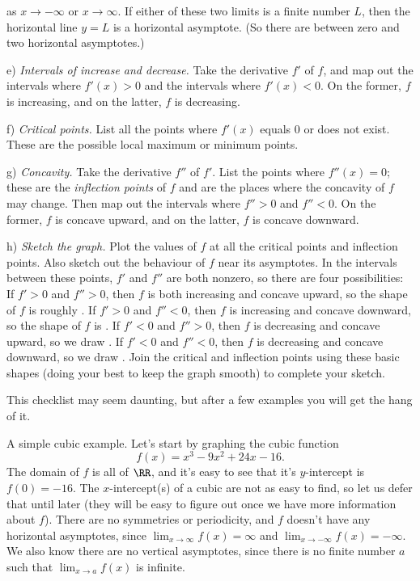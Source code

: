 as $x\to -\infty$ or $x\to \infty$. If either of these two limits is a finite number $L$, then the
horizontal line $y=L$ is a horizontal asymptote. (So there are between zero and two horizontal asymptotes.)
\smallskip
\item{e)} {\it Intervals of increase and decrease.} Take the derivative $f'$ of $f$, and map out the
intervals where $f'(x) > 0$ and the intervals where $f'(x) < 0$. On the former, $f$ is increasing,
and on the latter, $f$ is decreasing.
\smallskip
\item{f)} {\it Critical points.} List all the points where $f'(x)$ equals $0$ or does not exist. These
are the possible local maximum or minimum points.
\smallskip
\item{g)} {\it Concavity.} Take the derivative $f''$ of $f'$. List the points where $f''(x) = 0$;
these are the {\it inflection points} of $f$ and are the places where the concavity of $f$ may change.
Then map out the intervals where $f'' > 0$ and $f''<0$. On the former, $f$ is concave upward, and on the
latter, $f$ is concave downward.
\smallskip
\item{h)}\begingroup
{\it Sketch the graph.} Plot the values of $f$ at all the critical points and inflection points.
Also sketch out the behaviour of $f$ near its asymptotes.
In the intervals between these points, $f'$ and $f''$ are both nonzero, so there are four possibilities:
\smallskip
{} If $f' > 0$ and $f''>0$, then $f$ is both increasing and concave upward, so the shape of
$f$ is roughly .
\smallskip
{} If $f'>0$ and $f''<0$, then $f$ is increasing and concave downward, so the shape of $f$
is .
\smallskip
{} If $f'<0$ and $f''>0$, then $f$ is decreasing and concave upward, so we draw .
\smallskip
{} If $f'<0$ and $f''<0$, then $f$ is decreasing and concave downward, so we draw
.
\smallskip
Join the critical and inflection points using these basic shapes (doing your best to keep the graph smooth)
to complete your sketch.
\endgroup
\medskip

This checklist may seem daunting, but after a few examples you will get the hang of it.

\medskip\boldlabel A simple cubic example.
Let's start by graphing the cubic function
$$f(x) = x^3-9x^2 + 24x -16.$$
The domain of $f$ is all of $\RR$, and it's easy to see that it's $y$-intercept is $f(0) = -16$.
The $x$-intercept(s) of a cubic are not as easy to find, so let us defer that until later (they will
be easy to figure out once we have more information about $f$).
There are no symmetries or periodicity, and $f$ doesn't have any horizontal asymptotes,
since $\lim_{x\to \infty} f(x) = \infty$ and $\lim_{x\to -\infty} f(x) = -\infty$. We also know there are
no vertical asymptotes, since there is no finite number $a$ such that $\lim_{x\to a} f(x)$ is infinite.

